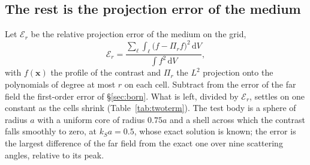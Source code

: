\documentclass[11pt,a4paper]{article}
\newcommand{\bx}{\mathbf{x}}
\newcommand{\cE}{\mathcal{E}}
\newcommand{\dd}{\mathrm{d}}
\begin{document}
\subsection{The rest is the projection error of the medium}\label{sec:rest}

Let $\cE_r$ be the relative projection error of the medium on the grid,
\begin{equation}\label{eq:proj}
  \cE_r=\frac{\sum_\ell\int_\ell\bigl(f-\Pi_rf\bigr)^2\,\dd V}{\int f^2\,\dd V},
\end{equation}
with $f(\bx)$ the profile of the contrast and $\Pi_r$ the $L^2$ projection onto the polynomials of
degree at most $r$ on each cell. Subtract from the error of the far field the first-order error of
\S\ref{sec:born}. What is left, divided by $\cE_r$, settles on one constant as the cells shrink
(Table~\ref{tab:twoterm}). The test
body is a sphere of radius $a$ with a uniform core of radius $0.75a$ and a shell across which the
contrast falls smoothly to zero, at $k_Sa=0.5$, whose exact solution is known; the error is the largest
difference of the far field from the exact one over nine scattering angles, relative to its peak.
\end{document}
